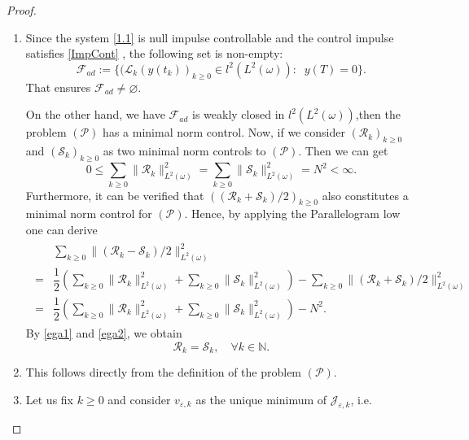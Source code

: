 \documentclass[sn-mathphys]{sn-jnl}
\begin{document}
\begin{proof}
    \begin{enumerate}
    \item[i)] Since the system \eqref{1.1} is null impulse controllable and the control impulse satisfies \eqref{ImpCont} , the following set is non-empty:
        \begin{equation*}
            \mathcal{F}_{ad}:=\lbrace (\mathcal{L}_{k}(y(t_k))_{k\geq 0}\in l^2(L^2(\omega)): \;\;y(T)=0 \rbrace.
        \end{equation*}
That ensures  $\mathcal{F}_{ad} \neq \varnothing$.

    On the other hand, we have $\mathcal{F}_{ad}$ is weakly closed in $l^2(L^2(\omega))$,then the problem $(\mathcal{P})$ has a minimal norm control. Now, if we consider  $(\mathcal{R}_k)_{k\geq 0}$ and $(\mathcal{S}_k)_{k\geq 0}$ as two minimal norm controls to $(\mathcal{P})$. Then we can get
    \begin{equation}\label{ega1}
    0\leq \sum\limits_{k\geq 0}\| \mathcal{R}_{k} \|_{L^2(\omega)}^2=\sum\limits_{k\geq 0}\| \mathcal{S}_{k} \|_{L^2(\omega)}^2=N^2<\infty. 
    \end{equation} 
    Furthermore, it can be verified that $\left((\mathcal{R}_k+\mathcal{S}_k)/2\right)_{k\geq 0}$ also constitutes a minimal norm control for $(\mathcal{P})$. Hence, by applying the Parallelogram low one can derive
    \begin{align}\label{ega2}
    \begin{split}
    &\sum\limits_{k\geq 0}\| (\mathcal{R}_k-\mathcal{S}_k)/2 \|_{L^2(\omega)}^2\\
    = &\dfrac{1}{2}\left( \sum\limits_{k\geq 0}\| \mathcal{R}_{k} \|_{L^2(\omega)}^2+\sum\limits_{k\geq 0}\| \mathcal{S}_{k} \|_{L^2(\omega)}^2\right) - \sum\limits_{k\geq 0}\| (\mathcal{R}_k+\mathcal{S}_k)/2 \|_{L^2(\omega)}^2\\
    = &\dfrac{1}{2}\left( \sum\limits_{k\geq 0}\| \mathcal{R}_{k} \|_{L^2(\omega)}^2+\sum\limits_{k\geq 0}\| \mathcal{S}_{k} \|_{L^2(\omega)}^2\right) - N^2.
     \end{split}
     \end{align} 
    By \eqref{ega1} and \eqref{ega2}, we obtain 
    \[ \mathcal{R}_k=\mathcal{S}_k, \quad \forall k\in \mathbb{N}. \]
    \item[ii)] This follows directly from the definition of the problem \((\mathcal{P})\).
    \item[iii)] Let us fix $k\geq 0$ and consider $v_{\varepsilon,k}$ as the unique minimum of $\mathcal{J}_{\varepsilon,k}$, i.e. 

\end{enumerate}
\end{proof}
\end{document}
